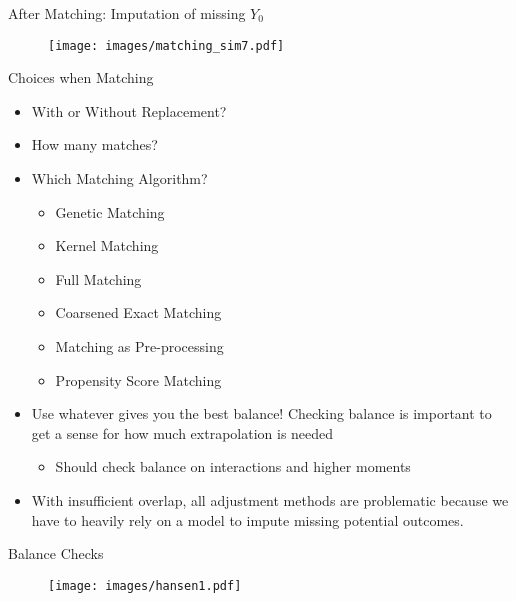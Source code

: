 \documentclass{beamer}
\numberwithin{equation}{section}
\begin{document}
\begin{frame}{After Matching: Imputation of missing $Y_0$}
\vspace{-.3in}
\begin{figure}[ht] \centering
    \texttt{[image: images/matching\_sim7.pdf]}
\end{figure}

\end{frame}

\begin{frame}{Choices when Matching}

\begin{itemize}
\itemsep1pt\parskip0pt
\item
  With or Without Replacement? \pause
\item
  How many matches? \pause
\item
  Which Matching Algorithm?

  \begin{itemize}
  \itemsep1pt\parskip0pt
  \item
    Genetic Matching
  \item
    Kernel Matching
  \item
    Full Matching
  \item
    Coarsened Exact Matching
  \item
    Matching as Pre-processing
  \item
    Propensity Score Matching \pause
  \end{itemize}
\item
  Use whatever gives you the best balance! Checking balance is important
  to get a sense for how much extrapolation is needed

  \begin{itemize}
  \itemsep1pt\parskip0pt
  \item
    Should check balance on interactions and higher moments
  \end{itemize}
\item
  With insufficient overlap, all adjustment methods are problematic
  because we have to heavily rely on a model to impute missing potential
  outcomes.
\end{itemize}

\end{frame}

\begin{frame}{Balance Checks}

\begin{figure}[ht] \centering
    \texttt{[image: images/hansen1.pdf]}
\end{figure}

\end{frame}
\end{document}
